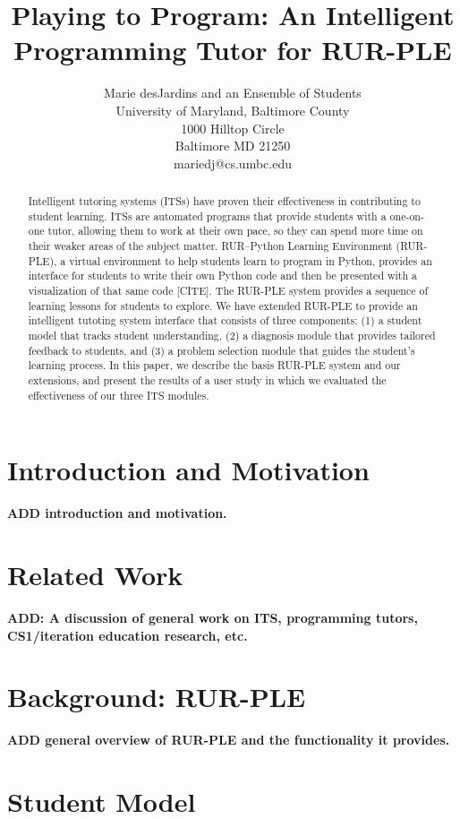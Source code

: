 \documentclass[twocolumn]{article}
\title{Playing to Program:  An Intelligent Programming Tutor for RUR-PLE}
\author{Marie desJardins and an Ensemble of Students \\
University of Maryland, Baltimore County \\ 
1000 Hilltop Circle \\
Baltimore MD  21250 \\
mariedj@cs.umbc.edu
}
\newcommand{\fix}[1]{{\bf #1}}
\begin{document}
\maketitle

\begin{abstract}
Intelligent tutoring systems (ITSs) have proven their effectiveness in
contributing to student learning.  ITSs are automated programs
that provide students with a one-on-one tutor, allowing them to work
at their own pace, so they can spend more time on their weaker areas
of the subject matter.  RUR--Python Learning Environment (RUR-PLE), a
virtual environment to help 
students learn to program in Python, provides an interface for
students to write their own Python code and then be presented with a
visualization of that same code [CITE].  
The RUR-PLE system provides a sequence of learning lessons for
students to explore.  We have extended RUR-PLE to provide an
intelligent tutoting system interface that consists of three
components:  (1) a
student model that tracks student understanding, (2) a diagnosis module
that provides tailored feedback to students, and (3) a problem selection
module that guides the student's learning process.  In this paper, we
describe the basis RUR-PLE system and our extensions, and present the
results of a user study in which we evaluated the effectiveness of our
three ITS modules.
\end{abstract}

\section{Introduction and Motivation}
\label{sec:intro}

\fix{ADD introduction and motivation.}

\section{Related Work}
\label{sec:related-work}

\fix{ADD: A discussion of general work on ITS, programming tutors,
CS1/iteration education research, etc.}

\section{Background: RUR-PLE}
\label{sec:background}

\fix{ADD general overview of RUR-PLE and the functionality
it provides.}

\section{Student Model}
\label{sec:student-model}
\end{document}
